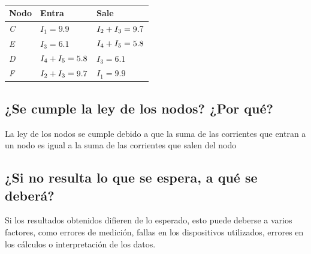 \documentclass[twocolumn, 12pt]{article}
\begin{document}
\begin{table}[H]
    \captionsetup{justification=centering}
    \centering

    \begin{tabularx}{0.9\linewidth}{|>{\centering\arraybackslash}X|>{\centering\arraybackslash}X|>{\centering\arraybackslash}X|}
        \hline
        \textbf{Nodo} & \textbf{Entra}               & \textbf{Sale}                \\\hline

        \textit{C}    & $I_1 = 9.9$                  & $I_2 + I_3 \linebreak = 9.7$ \\\hline

        \textit{E}    & $I_3 = 6.1$                  & $I_4 + I_5 \linebreak = 5.8$ \\\hline

        \textit{D}    & $I_4 + I_5 \linebreak = 5.8$ & $I_3 = 6.1$                  \\\hline

        \textit{F}    & $I_2 + I_3 \linebreak = 9.7$ & $I_1 = 9.9$                  \\\hline

    \end{tabularx}
    \caption{}

    \label{tab:analisisDatos__6}
\end{table}

\subsection{¿Se cumple la ley de los nodos? ¿Por qué?}

La ley de los nodos se cumple debido a que la suma de las
corrientes que entran a un nodo es igual a la suma de las
corrientes que salen del nodo

\subsection{¿Si no resulta lo que se espera, a qué se deberá?}

Si los resultados obtenidos difieren de lo esperado, esto
puede deberse a varios factores, como errores de medición,
fallas en los dispositivos utilizados, errores en los
cálculos o interpretación de los datos.
\end{document}
